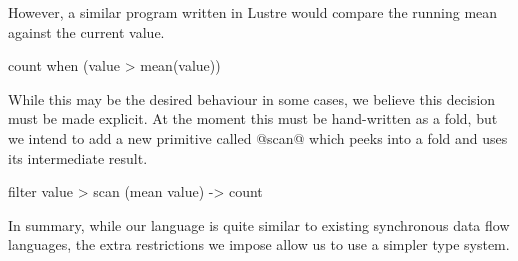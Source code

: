 However, a similar program written in {\sc Lustre} would compare the running mean against the current value.
\begin{code}
count when (value > mean(value))
\end{code}

While this may be the desired behaviour in some cases, we believe this decision must be made explicit.
At the moment this must be hand-written as a fold, but we intend to add a new primitive called @scan@ which peeks into a fold and uses its intermediate result.
\begin{code}
   filter value > scan (mean value)
-> count
\end{code}

In summary, while our language is quite similar to existing synchronous data flow languages, the extra restrictions we impose allow us to use a simpler type system.

